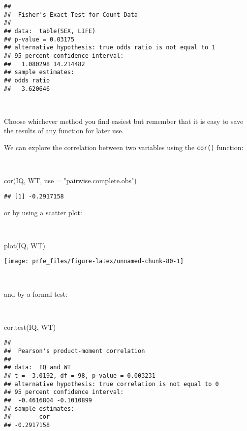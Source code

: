 \documentclass[
  12pt,
  a4paper]{book}
\newenvironment{Shaded}{\begin{snugshade}}{\end{snugshade}}
\newcommand{\AttributeTok}[1]{\textcolor[rgb]{0.77,0.63,0.00}{#1}}
\newcommand{\FunctionTok}[1]{\textcolor[rgb]{0.00,0.00,0.00}{#1}}
\newcommand{\NormalTok}[1]{#1}
\newcommand{\StringTok}[1]{\textcolor[rgb]{0.31,0.60,0.02}{#1}}
\begin{document}
\begin{verbatim}
## 
##  Fisher's Exact Test for Count Data
## 
## data:  table(SEX, LIFE)
## p-value = 0.03175
## alternative hypothesis: true odds ratio is not equal to 1
## 95 percent confidence interval:
##   1.080298 14.214482
## sample estimates:
## odds ratio 
##   3.620646
\end{verbatim}

~

Choose whichever method you find easiest but remember that it is easy to save the results of any function for later use.

We can explore the correlation between two variables using the \texttt{cor()} function:

~

\begin{Shaded}
\begin{Highlighting}[]
\FunctionTok{cor}\NormalTok{(IQ, WT, }\AttributeTok{use =} \StringTok{"pairwise.complete.obs"}\NormalTok{)}
\end{Highlighting}
\end{Shaded}

\begin{verbatim}
## [1] -0.2917158
\end{verbatim}

\newpage

or by using a scatter plot:

~

\begin{Shaded}
\begin{Highlighting}[]
\FunctionTok{plot}\NormalTok{(IQ, WT)}
\end{Highlighting}
\end{Shaded}

\begin{center}\texttt{[image: prfe\_files/figure-latex/unnamed-chunk-80-1]} \end{center}

~

and by a formal test:

~

\begin{Shaded}
\begin{Highlighting}[]
\FunctionTok{cor.test}\NormalTok{(IQ, WT)}
\end{Highlighting}
\end{Shaded}

\begin{verbatim}
## 
##  Pearson's product-moment correlation
## 
## data:  IQ and WT
## t = -3.0192, df = 98, p-value = 0.003231
## alternative hypothesis: true correlation is not equal to 0
## 95 percent confidence interval:
##  -0.4616804 -0.1010899
## sample estimates:
##        cor 
## -0.2917158
\end{verbatim}
\end{document}
